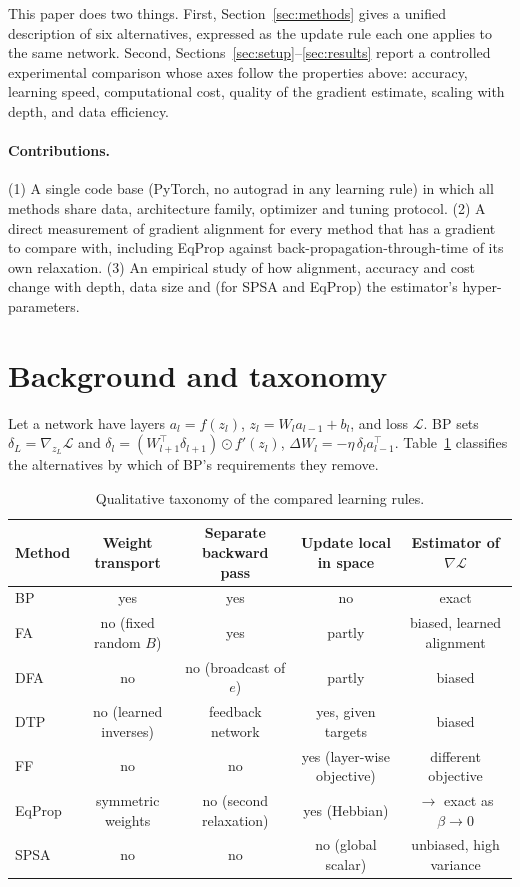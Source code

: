 \documentclass[11pt]{article}
\begin{document}
This paper does two things. First, Section~\ref{sec:methods} gives a unified description of six alternatives, expressed as the update rule each one applies to the same network. Second, Sections~\ref{sec:setup}--\ref{sec:results} report a controlled experimental comparison whose axes follow the properties above: accuracy, learning speed, computational cost, quality of the gradient estimate, scaling with depth, and data efficiency.

\paragraph{Contributions.} (1) A single code base (PyTorch, no autograd in any learning rule) in which all methods share data, architecture family, optimizer and tuning protocol. (2) A direct measurement of gradient alignment for every method that has a gradient to compare with, including EqProp against back-propagation-through-time of its own relaxation. (3) An empirical study of how alignment, accuracy and cost change with depth, data size and (for SPSA and EqProp) the estimator's hyper-parameters.

\section{Background and taxonomy}
Let a network have layers $a_l = f(z_l)$, $z_l = W_l a_{l-1} + b_l$, and loss $\mathcal{L}$. BP sets $\delta_L=\nabla_{z_L}\mathcal L$ and $\delta_l = (W_{l+1}^\top\delta_{l+1})\odot f'(z_l)$, $\Delta W_l=-\eta\,\delta_l a_{l-1}^\top$. Table~\ref{tab:taxonomy} classifies the alternatives by which of BP's requirements they remove.

\begin{table}[h]\centering\small
\begin{tabular}{lcccc}\toprule
Method & Weight transport & Separate backward pass & Update local in space & Estimator of $\nabla\mathcal L$ \\ \midrule
BP & yes & yes & no & exact \\
FA & no (fixed random $B$) & yes & partly & biased, learned alignment \\
DFA & no & no (broadcast of $e$) & partly & biased \\
DTP & no (learned inverses) & feedback network & yes, given targets & biased \\
FF & no & no & yes (layer-wise objective) & different objective \\
EqProp & symmetric weights & no (second relaxation) & yes (Hebbian) & $\to$ exact as $\beta\to0$ \\
SPSA & no & no & no (global scalar) & unbiased, high variance \\ \bottomrule
\end{tabular}
\caption{Qualitative taxonomy of the compared learning rules.}\label{tab:taxonomy}
\end{table}
\end{document}
